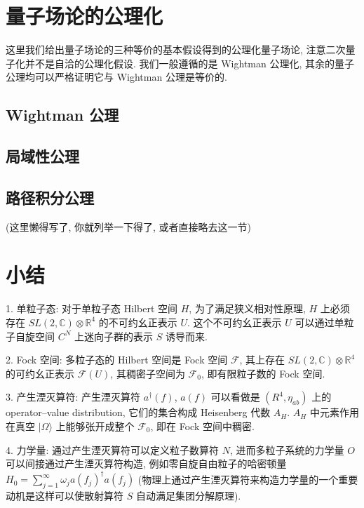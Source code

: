 \documentclass{article}
\begin{document}
\section{量子场论的公理化}
这里我们给出量子场论的三种等价的基本假设得到的公理化量子场论, 注意二次量子化并不是自洽的公理化假设. 我们一般遵循的是 Wightman 公理化, 其余的量子公理均可以严格证明它与 Wightman 公理是等价的.
\subsection{Wightman 公理}
\subsection{局域性公理}
\subsection{路径积分公理}(这里懒得写了, 你就列举一下得了, 或者直接略去这一节)
\section{小结}
1. 单粒子态: 对于单粒子态 Hilbert 空间 $H$, 为了满足狭义相对性原理, $H$ 上必须存在 $SL(2,\mathbb{C})\otimes\mathbb{R}^{4}$ 的不可约幺正表示 $U$. 这个不可约幺正表示 $U$ 可以通过单粒子自旋空间 $C^{N}$ 上迷向子群的表示 $S$ 诱导而来.
\par
2. Fock 空间: 多粒子态的 Hilbert 空间是 Fock 空间 $\mathcal{F}$, 其上存在 $SL(2,\mathbb{C})\otimes\mathbb{R}^{4}$ 的可约幺正表示 $\mathcal{F}(U)$, 其稠密子空间为 $\mathcal{F}_{0}$, 即有限粒子数的 Fock 空间.
\par
3. 产生湮灭算符: 产生湮灭算符 $a^{\dagger}(f)$, $a(f)$ 可以看做是 $(R^{4},\eta_{ab})$ 上的 operator--value distribution, 它们的集合构成 Heisenberg 代数 $A_{H}$. $A_{H}$ 中元素作用在真空 $|\Omega\rangle$ 上能够张开成整个 $\mathcal{F}_{0}$, 即在 Fock 空间中稠密.
\par
4. 力学量: 通过产生湮灭算符可以定义粒子数算符 $N$, 进而多粒子系统的力学量 $O$ 可以间接通过产生湮灭算符构造, 例如零自旋自由粒子的哈密顿量 $H_{0}=\sum_{j=1}^{\infty}\omega_{j}a(f_{j})^{\dagger}a(f_{j})$ (物理上通过产生湮灭算符来构造力学量的一个重要动机是这样可以使散射算符 $S$ 自动满足集团分解原理).
\end{document}
